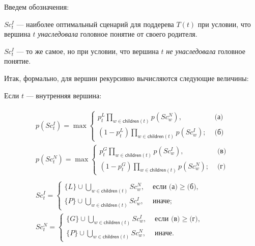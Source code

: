 \documentclass[12pt]{article}
\newenvironment{itemize*}%
{\begin{itemize}%
	\setlength{\itemsep}{0pt}%
	\setlength{\parskip}{0pt}}%
{\end{itemize}}
\newcommand{\children}[1] {\textsf{children}(#1)}
\let\smallcup\cup
\renewcommand{\cup}{\bigcup}
\begin{document}
Введем обозначения:

\newcommand{\ScIt}{Sc_t^I}
\newcommand{\ScNt}{Sc_t^N}
\newcommand{\ScIw}{Sc_w^I}
\newcommand{\ScNw}{Sc_w^N}
\begin{itemize*}
	\item $\ScIt$ --- наиболее оптимальный сценарий для поддерева $T(t)$ при условии, что вершина $t$ \emph{унаследовала} головное понятие от своего родителя.
	\item $\ScIt$ --- то же самое, но при условии, что вершина $t$ \emph{не унаследовала} головное понятие.
\end{itemize*}

 Итак, формально, для вершин рекурсивно вычисляются следующие величины:
 \begin{itemize*}
 	\item Если $t$ --- внутренняя вершина:
 	
 	\newcommand{\pInhLost}{p_t^L\prod_{w\in\children{t}}p(\ScNw)}
 	\newcommand{\pInhPass}{(1-p_t^L)\prod_{w\in\children{t}}p(\ScIw)}
 	\newcommand{\pNotInhGain}{p_t^G\prod_{w\in\children{t}}p(\ScIw)}
 	\newcommand{\pNotInhPass}{(1-p_t^G)\prod_{w\in\children{t}}p(\ScNw)}
 	\begin{equation}
	 	\begin{aligned}
		 	\begin{aligned}
		 	p(\ScIt) = \max\begin{cases}
			 	\pInhLost, &\text{ (а)} \\
			 	\pInhPass; &\text{ (б)}
		 	\end{cases} \\
		 	p(\ScNt) = \max\begin{cases}
			 	\pNotInhGain, &\text{ (в)} \\
			 	\pNotInhPass; &\text{ (г)}
		 	\end{cases}
	 	\end{aligned} \\
	 	\begin{aligned}
		 	\ScIt = \begin{cases}
			 	\{L\}\smallcup \cup_{w\in\children{t}}\ScNw, &\text{ если (а)} \geq \text{(б)}, \\
			 	\{P\}\smallcup \cup_{w\in\children{t}}\ScIw, &\text{ иначе};
		 	\end{cases} \\
		 	\ScNt = \begin{cases}
			 	\{G\}\smallcup \cup_{w\in\children{t}}\ScIw, &\text{ если (в)} \geq \text{(г)}, \\
			 	\{P\}\smallcup \cup_{w\in\children{t}}\ScNw, &\text{ иначе}.
		 	\end{cases} \\
		 	\end{aligned}
		 	\end{aligned}
		 	\label{eq:mals_recurs_p}
 	\end{equation}
 	

\end{itemize*}
\end{document}
